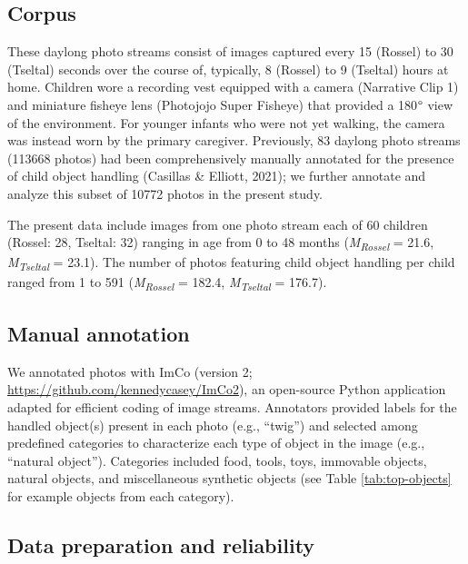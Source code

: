 \documentclass[10pt, letterpaper]{article}
\begin{document}
\hypertarget{corpus}{%
\subsection{Corpus}\label{corpus}}

These daylong photo streams consist of images captured every 15 (Rossel)
to 30 (Tseltal) seconds over the course of, typically, 8 (Rossel) to 9
(Tseltal) hours at home. Children wore a recording vest equipped with a
camera (Narrative Clip 1) and miniature fisheye lens (Photojojo Super
Fisheye) that provided a 180\(\text{\textdegree}\) view of the
environment. For younger infants who were not yet walking, the camera
was instead worn by the primary caregiver. Previously, 83 daylong photo
streams (113668 photos) had been comprehensively manually annotated for
the presence of child object handling (Casillas \& Elliott, 2021); we
further annotate and analyze this subset of 10772 photos in the present
study.

The present data include images from one photo stream each of 60
children (Rossel: 28, Tseltal: 32) ranging in age from 0 to 48 months
(\emph{M}\textsubscript{\emph{Rossel}} = 21.6,
\emph{M}\textsubscript{\emph{Tseltal}} = 23.1). The number of photos
featuring child object handling per child ranged from 1 to 591
(\emph{M}\textsubscript{\emph{Rossel}} = 182.4,
\emph{M}\textsubscript{\emph{Tseltal}} = 176.7).

\hypertarget{manual-annotation}{%
\subsection{Manual annotation}\label{manual-annotation}}

We annotated photos with ImCo (version 2;
\url{https://github.com/kennedycasey/ImCo2}), an open-source Python
application adapted for efficient coding of image streams. Annotators
provided labels for the handled object(s) present in each photo (e.g.,
``twig'') and selected among predefined categories to characterize each
type of object in the image (e.g., ``natural object''). Categories
included food, tools, toys, immovable objects, natural objects, and
miscellaneous synthetic objects (see Table \ref{tab:top-objects} for
example objects from each category).

\hypertarget{data-preparation-and-reliability}{%
\subsection{Data preparation and
reliability}\label{data-preparation-and-reliability}}
\end{document}
